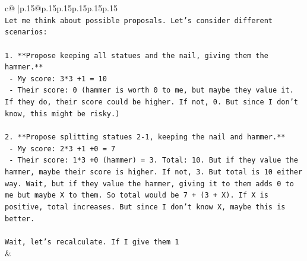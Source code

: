 \documentclass{article}
\begin{document}
{\begin{supertabular}{c@{$\;$}|p{.15\linewidth}@{}p{.15\linewidth}p{.15\linewidth}p{.15\linewidth}p{.15\linewidth}p{.15\linewidth}}
{{{\\ 
\texttt{Let me think about possible proposals. Let's consider different scenarios:} \\
\\ 
\texttt{1. **Propose keeping all statues and the nail, giving them the hammer.**} \\
\texttt{   {-} My score: 3*3 +1 = 10} \\
\texttt{   {-} Their score: 0 (hammer is worth 0 to me, but maybe they value it. If they do, their score could be higher. If not, 0. But since I don't know, this might be risky.)} \\
\\ 
\texttt{2. **Propose splitting statues 2{-}1, keeping the nail and hammer.**} \\
\texttt{   {-} My score: 2*3 +1 +0 = 7} \\
\texttt{   {-} Their score: 1*3 +0 (hammer) = 3. Total: 10. But if they value the hammer, maybe their score is higher. If not, 3. But total is 10 either way. Wait, but if they value the hammer, giving it to them adds 0 to me but maybe X to them. So total would be 7 + (3 + X). If X is positive, total increases. But since I don't know X, maybe this is better.} \\
\\ 
\texttt{Wait, let's recalculate. If I give them 1} \\
            }
        }
    }
    & \\ \\


\end{supertabular}}
\end{document}
